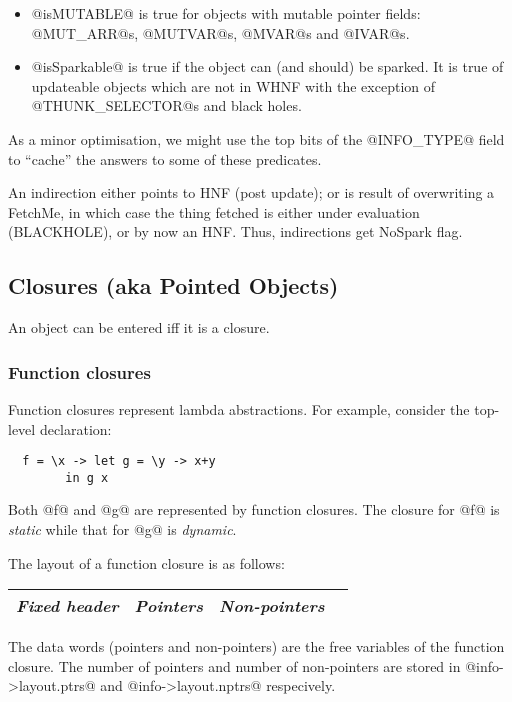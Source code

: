 \documentclass[11pt]{article}
\newcommand{\Subsubsection}[2]{\subsubsection{#1}\label{sec:#2}}
\begin{document}
\begin{itemize}

\item @isMUTABLE@ is true for objects with mutable pointer fields:
  @MUT_ARR@s, @MUTVAR@s, @MVAR@s and @IVAR@s.

\item @isSparkable@ is true if the object can (and should) be sparked.
It is true of updateable objects which are not in WHNF with the
exception of @THUNK_SELECTOR@s and black holes.

\end{itemize}

As a minor optimisation, we might use the top bits of the @INFO_TYPE@
field to ``cache'' the answers to some of these predicates.

An indirection either points to HNF (post update); or is result of
overwriting a FetchMe, in which case the thing fetched is either under
evaluation (BLACKHOLE), or by now an HNF.  Thus, indirections get
NoSpark flag.

\subsection{Closures (aka Pointed Objects)}

An object can be entered iff it is a closure.

\Subsubsection{Function closures}{FUN}

Function closures represent lambda abstractions.  For example,
consider the top-level declaration:
\begin{verbatim}
  f = \x -> let g = \y -> x+y
	    in g x
\end{verbatim}
Both @f@ and @g@ are represented by function closures.  The closure
for @f@ is \emph{static} while that for @g@ is \emph{dynamic}.

The layout of a function closure is as follows:
\begin{center}
\begin{tabular}{|l|l|l|l|}\hline
\emph{Fixed header}  & \emph{Pointers} & \emph{Non-pointers} \\ \hline
\end{tabular}
\end{center}

The data words (pointers and non-pointers) are the free variables of
the function closure.  The number of pointers and number of
non-pointers are stored in @info->layout.ptrs@ and
@info->layout.nptrs@ respecively.
\end{document}
